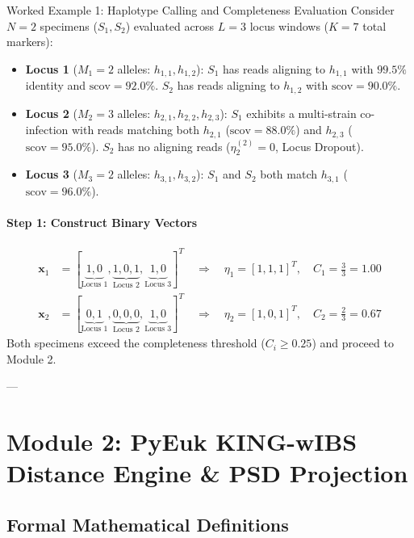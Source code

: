\documentclass[11pt,a4paper]{article}
\begin{document}
\begin{examplebox}{Worked Example 1: Haplotype Calling and Completeness Evaluation}
Consider $N=2$ specimens ($S_1, S_2$) evaluated across $L=3$ locus windows ($K=7$ total markers):
\begin{itemize}
    \item \textbf{Locus 1} ($M_1=2$ alleles: $h_{1,1}, h_{1,2}$): $S_1$ has reads aligning to $h_{1,1}$ with $99.5\%$ identity and $\text{scov}=92.0\%$. $S_2$ has reads aligning to $h_{1,2}$ with $\text{scov}=90.0\%$.
    \item \textbf{Locus 2} ($M_2=3$ alleles: $h_{2,1}, h_{2,2}, h_{2,3}$): $S_1$ exhibits a multi-strain co-infection with reads matching both $h_{2,1}$ ($\text{scov}=88.0\%$) and $h_{2,3}$ ($\text{scov}=95.0\%$). $S_2$ has no aligning reads ($\eta_2^{(2)} = 0$, Locus Dropout).
    \item \textbf{Locus 3} ($M_3=2$ alleles: $h_{3,1}, h_{3,2}$): $S_1$ and $S_2$ both match $h_{3,1}$ ($\text{scov}=96.0\%$).
\end{itemize}

\paragraph{Step 1: Construct Binary Vectors}
\begin{align*}
\mathbf{x}_1 &= [\underbrace{1, 0}_{\text{Locus 1}}, \underbrace{1, 0, 1}_{\text{Locus 2}}, \underbrace{1, 0}_{\text{Locus 3}}]^T \quad \Rightarrow \quad \eta_1 = [1, 1, 1]^T, \quad C_1 = \frac{3}{3} = 1.00 \\
\mathbf{x}_2 &= [\underbrace{0, 1}_{\text{Locus 1}}, \underbrace{0, 0, 0}_{\text{Locus 2}}, \underbrace{1, 0}_{\text{Locus 3}}]^T \quad \Rightarrow \quad \eta_2 = [1, 0, 1]^T, \quad C_2 = \frac{2}{3} = 0.67
\end{align*}
Both specimens exceed the completeness threshold ($C_i \ge 0.25$) and proceed to Module 2.
\end{examplebox}

---

\section{Module 2: PyEuk KING-wIBS Distance Engine \& PSD Projection}

\subsection{Formal Mathematical Definitions}
\end{document}
